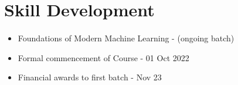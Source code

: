 \documentclass[aspectratio=169]{beamer}
\begin{document}
\section{Skill Development }
\begin{frame}[fragile=singleslide]{\insertsectionhead}
  \framesubtitle{\insertsubsectionhead}
\begin{center}
\begin{itemize}
\item Foundations of Modern Machine Learning - (ongoing batch)
\item Formal commencement of Course - 01 Oct 2022
\item Financial awards  to first batch - Nov 23
\end{itemize}
\end{center}
\end{frame}
\end{document}
